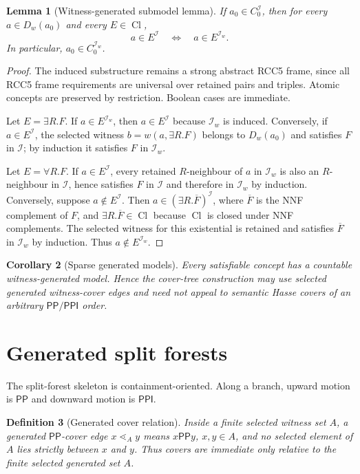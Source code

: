 \documentclass[11pt]{article}
\newtheorem{definition}{Definition}[section]
\newtheorem{lemma}[definition]{Lemma}
\newtheorem{corollary}[definition]{Corollary}
\theoremstyle{remark}
\newcommand{\PP}{\mathsf{PP}}
\newcommand{\PPI}{\mathsf{PPI}}
\newcommand{\Cl}{\operatorname{Cl}}
\newcommand{\I}{\mathcal{I}}
\begin{document}
\begin{lemma}[Witness-generated submodel lemma]\label{lem:witness-generated}
If $a_0\in C_0^\I$, then for every $a\in D_w(a_0)$ and every $E\in\Cl$,
\[
a\in E^\I\quad\Longleftrightarrow\quad a\in E^{\I_w}.
\]
In particular, $a_0\in C_0^{\I_w}$.
\end{lemma}
\begin{proof}
The induced substructure remains a strong abstract RCC5 frame, since all RCC5 frame requirements are universal over retained pairs and triples.  Atomic concepts are preserved by restriction.  Boolean cases are immediate.

Let $E=\exists R.F$.  If $a\in E^{\I_w}$, then $a\in E^\I$ because $\I_w$ is induced.  Conversely, if $a\in E^\I$, the selected witness $b=w(a,\exists R.F)$ belongs to $D_w(a_0)$ and satisfies $F$ in $\I$; by induction it satisfies $F$ in $\I_w$.

Let $E=\forall R.F$.  If $a\in E^\I$, every retained $R$-neighbour of $a$ in $\I_w$ is also an $R$-neighbour in $\I$, hence satisfies $F$ in $\I$ and therefore in $\I_w$ by induction.  Conversely, suppose $a\notin E^\I$.  Then $a\in(\exists R.\overline F)^\I$, where $\overline F$ is the NNF complement of $F$, and $\exists R.\overline F\in\Cl$ because $\Cl$ is closed under NNF complements.  The selected witness for this existential is retained and satisfies $\overline F$ in $\I_w$ by induction.  Thus $a\notin E^{\I_w}$.
\end{proof}

\begin{corollary}[Sparse generated models]\label{cor:sparse}
Every satisfiable concept has a countable witness-generated model.  Hence the cover-tree construction may use selected generated witness-cover edges and need not appeal to semantic Hasse covers of an arbitrary $\PP/\PPI$ order.
\end{corollary}

\section{Generated split forests}
The split-forest skeleton is containment-oriented.  Along a branch, upward motion is $\PP$ and downward motion is $\PPI$.

\begin{definition}[Generated cover relation]
Inside a finite selected witness set $A$, a generated $\PP$-cover edge $x\lessdot_A y$ means $x\PP y$, $x,y\in A$, and no selected element of $A$ lies strictly between $x$ and $y$.  Thus covers are immediate only relative to the finite selected generated set $A$.
\end{definition}
\end{document}
